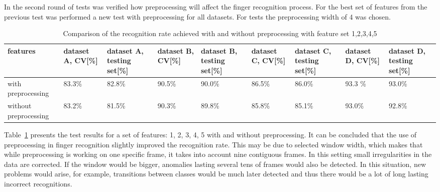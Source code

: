 In the second round of tests was verified how preprocessing will affect the finger recognition process. For the best set of features from the previous test was performed a new test with preprocessing for all datasets. For tests the preprocessing width of 4 was chosen.

\begin{table}[htp!]
\begin{center}
	\label{findiffpre}
	\caption{Comparison of the recognition rate achieved with and without preprocessing with feature set 1,2,3,4,5}
    \begin{tabular}{|p{1.3cm}|p{1.3cm}|p{1.3cm}|p{1.3cm}|p{1.3cm}|p{1.3cm}|p{1.3cm}|p{1.3cm}|p{1.3cm}|}
    \hline
    features & dataset A, CV[\%] & dataset A, testing set[\%] & dataset B, CV[\%] & dataset B, testing set[\%] & dataset C, CV[\%]& dataset C, testing set[\%]  & dataset D, CV[\%] & dataset D, testing set[\%]  \\ \hline
    with preprocessing          & 83.3\% & 82.8\%  & 90.5\% & 90.0\% & 86.5\% & 86.0\% & 93.3 \% & 93.0\% \\ \hline
    without preprocessing   	& 83.2\% & 81.5\% & 90.3\%  & 89.8\% & 85.8\% & 85.1\% & 93.0\% & 92.8\% \\ \hline
    \end{tabular}
    \end{center}
\end{table}

Table~\ref{findiffpre} presents the test results for a set of features: 1, 2, 3, 4, 5 with and without preprocessing. It can be concluded that the use of preprocessing in finger recognition slightly improved the recognition rate. This may be due to selected window width, which makes that while preprocessing is working on one specific frame, it takes into account nine contiguous frames. In this setting small irregularities in the data are corrected. If the window would be bigger, anomalies lasting several tens of frames would also be detected. In this situation, new problems would arise, for example, transitions between classes would be much later detected and thus there would be a lot of long lasting incorrect recognitions.





